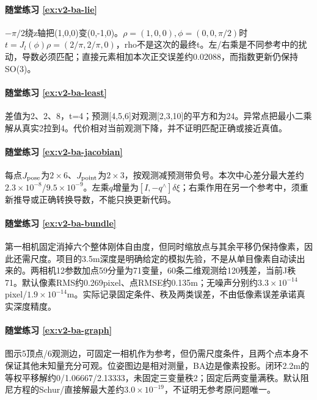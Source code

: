 \paragraph*{随堂练习 \ref{ex:v2-ba-lie}}
\begin{solution}
$-\pi/2$绕z轴把(1,0,0)变(0,-1,0)。$\rho=(1,0,0),\phi=(0,0,\pi/2)$时$t=J_l(\phi)\rho=(2/\pi,2/\pi,0)$，rho不是这次的最终t。左/右乘是不同参考中的扰动，导数必须匹配；直接元素相加本次正交误差约0.02088，而指数更新仍保持SO(3)。
\end{solution}

\paragraph*{随堂练习 \ref{ex:v2-ba-least}}
\begin{solution}
差值为2、2、8，t=4；预测[4,5,6]对观测[2,3,10]的平方和为24。异常点把最小二乘解从真实2拉到4。代价相对当前观测下降，并不证明匹配正确或接近真值。
\end{solution}

\paragraph*{随堂练习 \ref{ex:v2-ba-jacobian}}
\begin{solution}
每点$J_{\rm pose}$为$2\times6$、$J_{\rm point}$为$2\times3$，按观测减预测带负号。本次中心差分最大差约$2.3\times10^{-8}$/$9.5\times10^{-9}$。左乘$q$增量为$[I,-q^\wedge]\delta\xi$；右乘作用在另一个参考中，须重新推导或正确转换导数，不能只换更新代码。
\end{solution}

\paragraph*{随堂练习 \ref{ex:v2-ba-bundle}}
\begin{solution}
第一相机固定消掉六个整体刚体自由度，但同时缩放点与其余平移仍保持像素，因此还需尺度。项目的3.5m深度是明确给定的模拟先验，不是从单目像素自动读出来的。两相机12参数加点59分量为71变量，60条二维观测给120残差，当前J秩71。默认像素RMS约0.269pixel、点RMSE约0.135m；无噪声分别约$3.3\times10^{-14}$pixel/$1.9\times10^{-14}$m。实际记录固定条件、秩及两类误差，不由低像素误差承诺真实深度精度。
\end{solution}

\paragraph*{随堂练习 \ref{ex:v2-ba-graph}}
\begin{solution}
图示5顶点/6观测边，可固定一相机作为参考，但仍需尺度条件，且两个点本身不保证其他未知量充分可观。位姿图边是相对测量，BA边是像素投影。闭环2.2m的等权平移解约0/1.06667/2.13333，未固定三变量秩2；固定后两变量满秩。默认阻尼方程的Schur/直接解最大差约$3.0\times10^{-19}$，不证明无参考原问题唯一。
\end{solution}

